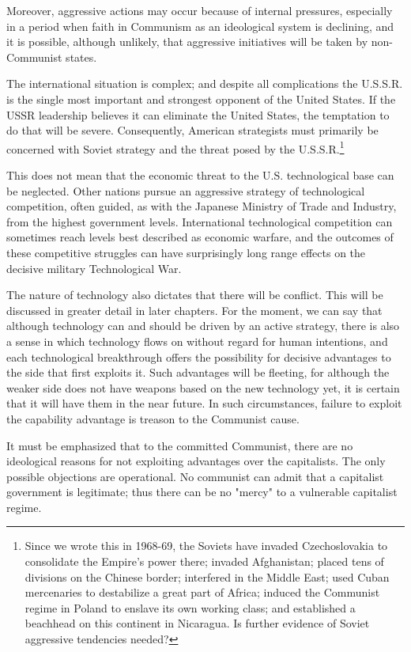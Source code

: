 Moreover, aggressive actions may occur because of internal pressures, especially in a period when faith in Communism as an ideological system is declining, and it is possible, although unlikely, that aggressive initiatives will be taken by non-Communist states.

The international situation is complex; and despite all complications the U.S.S.R. is the single most important and strongest opponent of the United States. If the USSR leadership believes it can eliminate the United States, the temptation to do that will be severe. Consequently, American strategists must primarily be concerned with Soviet strategy and the threat posed by the U.S.S.R.\footnote{Since we wrote this in 1968-69, the Soviets have invaded Czechoslovakia to consolidate the Empire's power there; invaded Afghanistan; placed tens of divisions on the Chinese border; interfered in the Middle East; used Cuban mercenaries to destabilize a great part of Africa; induced the Communist regime in Poland to enslave its own working class; and established a beachhead on this continent in Nicaragua. Is further evidence of Soviet aggressive tendencies needed?}

This does not mean that the economic threat to the U.S. technological base can be neglected. Other nations pursue an aggressive strategy of technological competition, often guided, as with the Japanese Ministry of Trade and Industry, from the highest government levels. International technological competition can sometimes reach levels best described as economic warfare, and the outcomes of these competitive struggles can have surprisingly long range effects on the decisive military Technological War.

The nature of technology also dictates that there will be conflict. This will be discussed in greater detail in later chapters. For the moment, we can say that although technology can and should be driven by an active strategy, there is also a sense in which technology flows on without regard for human intentions, and each technological breakthrough offers the possibility for decisive advantages to the side that first exploits it. Such advantages will be fleeting, for although the weaker side does not have weapons based on the new technology yet, it is certain that it will have them in the near future. In such circumstances, failure to exploit the capability advantage is treason to the Communist cause.

It must be emphasized that to the committed Communist, there are no ideological reasons for not exploiting advantages over the capitalists. The only possible objections are operational. No communist can admit that a capitalist government is legitimate; thus there can be no "mercy" to a vulnerable capitalist regime.

